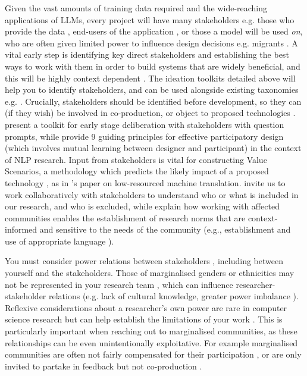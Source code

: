 \noindent Given the vast amounts of training data required and the wide-reaching applications of LLMs, every project will have many stakeholders e.g. those who provide the data \citep{havens_situated_2020}, end-users of the application \citep{yang2023impact}, or those a model will be used \emph{on}, who are often given limited power to influence design decisions e.g. migrants \citep{nalbandian_eye_2022}. A vital early step is identifying key direct stakeholders and establishing the best ways to work with them in order to build systems that are widely beneficial, and this will be highly context dependent \citep{sloane_participation_2022}. The ideation toolkits detailed above will help you to identify stakeholders, and can be used alongside existing taxonomies e.g. \citep[i.a.]{lewis_global_2020,langer_what_2021, bird_typology_2023, havens_situated_2020}. 
Crucially, stakeholders should be identified before development, so they can (if they wish) be involved in co-production, or object to proposed technologies \citep{munn_uselessness_2022}. \citet{kawakami_situate_2024} present a toolkit for early stage deliberation with stakeholders with question prompts, while \citet{caselli_guiding_2021} provide 9 guiding principles for effective participatory design (which involves mutual learning between designer and participant) in the context of NLP research. 
Input from stakeholders is vital for constructing Value Scenarios, a methodology which predicts the likely impact of a proposed technology \citep{nathan_value_2007}, as in \citet{haroutunian_ethical_2022}'s paper on low-resourced machine translation. 
\citet{havens_situated_2020} invite us to work collaboratively with stakeholders to understand who or what is included in our research, and who is excluded, while \citet{jurgens_just_2019} explain how working with affected communities enables the establishment of research norms that are context-informed and sensitive to the needs of the community (e.g., establishment and use of appropriate language \citep{jurgens_just_2019}).

You must consider power relations between stakeholders \citep{havens_situated_2020}, including between yourself and the stakeholders. Those of marginalised genders or ethnicities may not be represented in your research team \citep{west_discriminating_2019}, which can influence researcher-stakeholder relations (e.g. lack of cultural knowledge, greater power imbalance \citep{madaio2022assessing,fukuda-parr_emerging_2021,haque2024we}). Reflexive considerations about a researcher's own power are rare in computer science research \citep{ovalle_factoring_2023, devinney_theories_2022} but can help establish the limitations of your work \citep{liang_embracing_2021,liang_reflexivity_2021}. This is particularly important when reaching out to marginalised communities, as these relationships can be even unintentionally exploitative. For example marginalised communities are often not fairly compensated for their participation \cite{sloane_participation_2022}, or are only invited to partake in feedback but not co-production \cite{sloane_participation_2022, ungless_stereotypes_2023}.

